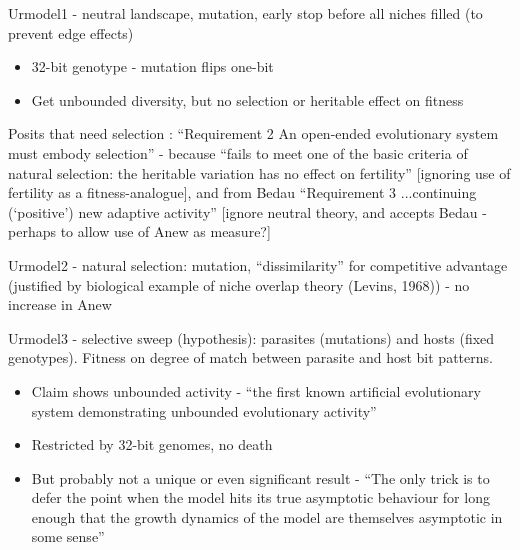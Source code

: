 	
	Urmodel1 - neutral landscape, mutation, early stop before all niches
	filled (to prevent edge effects)
	
	\begin{itemize}
		\item
		
		32-bit genotype - mutation flips one-bit
		
		\item
		
		Get unbounded diversity, but no selection or heritable effect on
		fitness
		
	\end{itemize}
	
	Posits that need selection : ``Requirement 2 An open-ended
	evolutionary system must embody selection'' - because ``fails to meet
	one of the basic criteria of natural selection: the heritable
	variation has no effect on fertility'' {[}ignoring use of fertility as
	a fitness-analogue{]}, and from Bedau ``Requirement 3 ...continuing
	(`positive') new adaptive activity'' {[}ignore neutral theory, and
	accepts Bedau - perhaps to allow use of Anew as measure?{]}
	

	Urmodel2 - natural selection: mutation, ``dissimilarity'' for
	competitive advantage (justified by biological example of niche
	overlap theory (Levins, 1968)) - no increase in Anew
	

	Urmodel3 - selective sweep (hypothesis): parasites (mutations) and
	hosts (fixed genotypes). Fitness on degree of match between parasite
	and host bit patterns.
	
	
	\begin{itemize}
		\item
		
		Claim shows unbounded activity - ``the first known artificial
		evolutionary system demonstrating unbounded evolutionary activity''
		
		\item
		
		Restricted by 32-bit genomes, no death
		
		\item
		
		But probably not a unique or even significant result - ``The only
		trick is to defer the point when the model hits its true asymptotic
		behaviour for long enough that the growth dynamics of the model are
		themselves asymptotic in some sense''
		
	\end{itemize}

